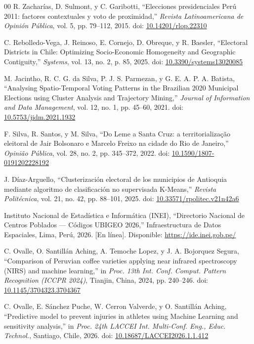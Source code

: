 \documentclass[conference,10pt,letterpaper]{IEEEtran}
\begin{document}
\begin{thebibliography}{00}
 R. Zacharías, D. Sulmont, y C. Garibotti, ``Elecciones presidenciales Perú 2011: factores contextuales y voto de proximidad,'' \textit{Revista Latinoamericana de Opinión Pública}, vol. 5, pp. 79--112, 2015. doi: \href{https://doi.org/10.14201/rlop.22310}{10.14201/rlop.22310}

 C. Rebolledo-Vega, J. Reinoso, E. Cornejo, D. Obreque, y R. Baesler, ``Electoral Districts in Chile: Optimizing Socio-Economic Homogeneity and Geographic Contiguity,'' \textit{Systems}, vol. 13, no. 2, p. 85, 2025. doi: \href{https://doi.org/10.3390/systems13020085}{10.3390/systems13020085}

 M. Jacintho, R. C. G. da Silva, P. J. S. Parmezan, y G. E. A. P. A. Batista, ``Analysing Spatio-Temporal Voting Patterns in the Brazilian 2020 Municipal Elections using Cluster Analysis and Trajectory Mining,'' \textit{Journal of Information and Data Management}, vol. 12, no. 1, pp. 45--60, 2021. doi: \href{https://doi.org/10.5753/jidm.2021.1932}{10.5753/jidm.2021.1932}

 F. Silva, R. Santos, y M. Silva, ``Do Leme a Santa Cruz: a territorialização eleitoral de Jair Bolsonaro e Marcelo Freixo na cidade do Rio de Janeiro,'' \textit{Opinião Pública}, vol. 28, no. 2, pp. 345--372, 2022. doi: \href{https://doi.org/10.1590/1807-0191202228192}{10.1590/1807-0191202228192}

 J. Díaz-Arguello, ``Clusterización electoral de los municipios de Antioquia mediante algoritmo de clasificación no supervisada K-Means,'' \textit{Revista Politécnica}, vol. 21, no. 42, pp. 88--101, 2025. doi: \href{https://doi.org/10.33571/rpolitec.v21n42a6}{10.33571/rpolitec.v21n42a6}

 Instituto Nacional de Estadística e Informática (INEI), ``Directorio Nacional de Centros Poblados --- Códigos UBIGEO 2026,'' Infraestructura de Datos Espaciales, Lima, Perú, 2026. [En línea]. Disponible: \url{https://ide.inei.gob.pe/}

 C. Ovalle, O. Santillán Aching, A. Temoche Lopez, y J. A. Bojorquez Segura, ``Comparison of Peruvian coffee varieties applying near infrared spectroscopy (NIRS) and machine learning,'' in \textit{Proc. 13th Int. Conf. Comput. Pattern Recognition (ICCPR 2024)}, Tianjin, China, 2024, pp. 240--246. doi: \href{https://doi.org/10.1145/3704323.3704367}{10.1145/3704323.3704367}

 C. Ovalle, E. Sánchez Puche, W. Cerron Valverde, y O. Santillán Aching, ``Predictive model to prevent injuries in athletes using Machine Learning and sensitivity analysis,'' in \textit{Proc. 24th LACCEI Int. Multi-Conf. Eng., Educ. Technol.}, Santiago, Chile, 2026. doi: \href{https://doi.org/10.18687/LACCEI2026.1.1.412}{10.18687/LACCEI2026.1.1.412}


\end{thebibliography}
\end{document}

